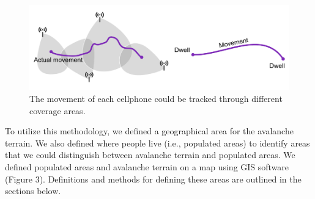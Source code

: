 \documentclass[authordate,empirical]{jote-new-article}
\begin{document}
\begin{figure}[h]
  \begin{fullwidth}


    \includegraphics[width=\linewidth]{media/image2.png}
    \caption{The movement of each cellphone could be tracked through different coverage areas.}
    \label{fig:rId9}

  \end{fullwidth}
\end{figure}






To utilize this methodology, we defined a geographical area for the avalanche terrain. We also defined where people live (i.e., populated areas) to identify areas that we could distinguish between avalanche terrain and populated areas. We defined populated areas and avalanche terrain on a map using GIS software (Figure 3). Definitions and methods for defining these areas are outlined in the sections below.
\end{document}
